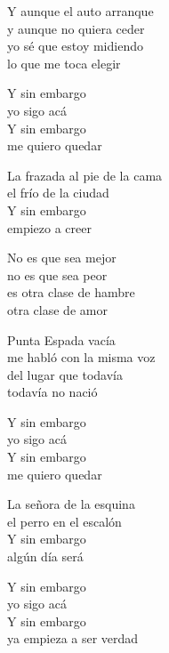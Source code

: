\begin{lyrics}
Y aunque el auto arranque\\
y aunque no quiera ceder\\
yo sé que estoy midiendo\\
lo que me toca elegir

Y sin embargo\\
yo sigo acá\\
Y sin embargo\\
me quiero quedar

La frazada al pie de la cama\\
el frío de la ciudad\\
Y sin embargo\\
empiezo a creer

No es que sea mejor\\
no es que sea peor\\
es otra clase de hambre\\
otra clase de amor

Punta Espada vacía\\
me habló con la misma voz\\
del lugar que todavía\\
todavía no nació

Y sin embargo\\
yo sigo acá\\
Y sin embargo\\
me quiero quedar

La señora de la esquina\\
el perro en el escalón\\
Y sin embargo\\
algún día será

Y sin embargo\\
yo sigo acá\\
Y sin embargo\\
ya empieza a ser verdad
\end{lyrics}